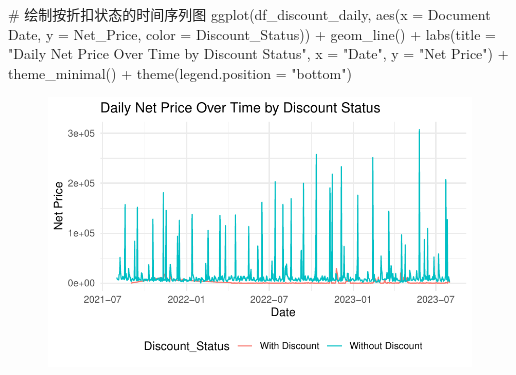 \documentclass[
  letterpaper,
  DIV=11,
  numbers=noendperiod]{scrartcl}
\newenvironment{Shaded}{\begin{snugshade}}{\end{snugshade}}
\newcommand{\AttributeTok}[1]{\textcolor[rgb]{0.40,0.45,0.13}{#1}}
\newcommand{\CommentTok}[1]{\textcolor[rgb]{0.37,0.37,0.37}{#1}}
\newcommand{\DecValTok}[1]{\textcolor[rgb]{0.68,0.00,0.00}{#1}}
\newcommand{\FunctionTok}[1]{\textcolor[rgb]{0.28,0.35,0.67}{#1}}
\newcommand{\NormalTok}[1]{\textcolor[rgb]{0.00,0.23,0.31}{#1}}
\newcommand{\OtherTok}[1]{\textcolor[rgb]{0.00,0.23,0.31}{#1}}
\newcommand{\SpecialCharTok}[1]{\textcolor[rgb]{0.37,0.37,0.37}{#1}}
\newcommand{\StringTok}[1]{\textcolor[rgb]{0.13,0.47,0.30}{#1}}
\begin{document}
\begin{Shaded}
\begin{Highlighting}[]
\CommentTok{\# 绘制按折扣状态的时间序列图}
\FunctionTok{ggplot}\NormalTok{(df\_discount\_daily, }\FunctionTok{aes}\NormalTok{(}\AttributeTok{x =} \StringTok{\textasciigrave{}}\AttributeTok{Document Date}\StringTok{\textasciigrave{}}\NormalTok{, }\AttributeTok{y =}\NormalTok{ Net\_Price, }\AttributeTok{color =}\NormalTok{ Discount\_Status)) }\SpecialCharTok{+}
  \FunctionTok{geom\_line}\NormalTok{() }\SpecialCharTok{+}
  \FunctionTok{labs}\NormalTok{(}\AttributeTok{title =} \StringTok{"Daily Net Price Over Time by Discount Status"}\NormalTok{,}
       \AttributeTok{x =} \StringTok{"Date"}\NormalTok{, }\AttributeTok{y =} \StringTok{"Net Price"}\NormalTok{) }\SpecialCharTok{+}
  \FunctionTok{theme\_minimal}\NormalTok{() }\SpecialCharTok{+}
  \FunctionTok{theme}\NormalTok{(}\AttributeTok{legend.position =} \StringTok{"bottom"}\NormalTok{)}
\end{Highlighting}
\end{Shaded}

\begin{figure}[H]

{\centering \includegraphics{Time-Serise-EDA_files/figure-pdf/unnamed-chunk-2-5.pdf}

}

\end{figure}

\begin{Shaded}
\end{Shaded}
\end{document}
